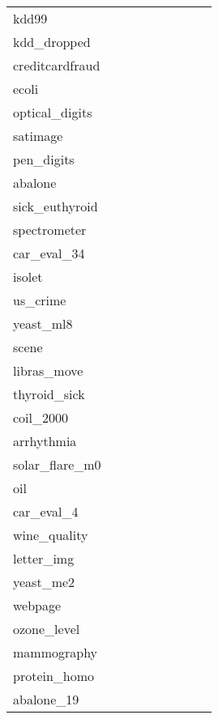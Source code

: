 \begin{table}[hbtb]
\begin{tabular}{l|*{4}{r}|*{4}{r}}
        kdd99 &&&&&&&& \\
        kdd\_dropped &&&&&&&& \\
        creditcardfraud &&&&&&&& \\
        ecoli &&&&&&&& \\
        optical\_digits &&&&&&&& \\
        satimage &&&&&&&& \\
        pen\_digits &&&&&&&& \\
        abalone &&&&&&&& \\
        sick\_euthyroid &&&&&&&& \\
        spectrometer &&&&&&&& \\
        car\_eval\_34 &&&&&&&& \\
        isolet &&&&&&&& \\
        us\_crime &&&&&&&& \\
        yeast\_ml8 &&&&&&&& \\
        scene &&&&&&&& \\
        libras\_move &&&&&&&& \\
        thyroid\_sick &&&&&&&& \\
        coil\_2000 &&&&&&&& \\
        arrhythmia &&&&&&&& \\
        solar\_flare\_m0 &&&&&&&& \\
        oil &&&&&&&& \\
        car\_eval\_4 &&&&&&&& \\
        wine\_quality &&&&&&&& \\
        letter\_img &&&&&&&& \\
        yeast\_me2 &&&&&&&& \\
        webpage &&&&&&&& \\
        ozone\_level &&&&&&&& \\
        mammography &&&&&&&& \\
        protein\_homo &&&&&&&& \\
        abalone\_19 &&&&&&&& \\
        \hline
    \end{tabular}

\end{table}


\newpage
